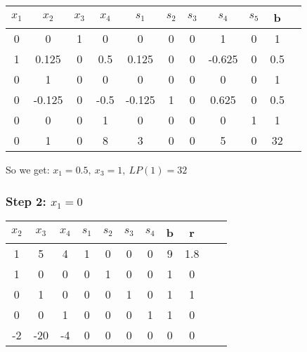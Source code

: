\documentclass{article}
\begin{document}
\begin{center}
\begin{tabular}{|c|c|c|c|c|c|c|c|c|c|c|}
\hline
$x_1$  & $x_2$ & $x_3$  & $x_4$ & $s_1$ & $s_2$ & $s_3$ & $s_4$ & $s_5$ & b     \\ \hline
0  & 0      & 1  & 0    & 0      & 0  & 0  & 1      & 0  & 1   \\ \hline
1  & 0.125  & 0  & 0.5  & 0.125  & 0  & 0  & -0.625 & 0  & 0.5   \\ \hline
0  & 1      & 0  & 0    & 0      & 0  & 0  & 0      & 0  & 1   \\ \hline
0  & -0.125 & 0  & -0.5 & -0.125 & 1  & 0  & 0.625  & 0  & 0.5 \\ \hline
0  & 0      & 0  & 1    & 0      & 0  & 0  & 0      & 1  & 1   \\ \hline
0  & 1      & 0  & 8    & 3      & 0  & 0  & 5      & 0  & 32  \\ \hline
\end{tabular}
\end{center}

So we get: $x_1=0.5,\: x_3=1, \: LP(1)=32$
\\
\subsubsection*{Step 2: $x_1=0$}
\begin{center}
\begin{tabular}{|c|c|c|c|c|c|c|c|c|c|c|}
\hline
$x_2$ & $x_3$  & $x_4$ & $s_1$ & $s_2$ & $s_3$ & $s_4$ & b  & r \\ \hline
1  & \cellcolor{pink!25}5   & 4  & 1  & 0  & 0  & 0  & 9 & 1.8 \\ \hline
1  & \cellcolor{pink!25}0   & 0  & 0  & 1  & 0  & 0  & 1 & 0   \\ \hline
0\cellcolor{yellow!25}  & \cellcolor{pink!25}1   & \cellcolor{yellow!25}0  & \cellcolor{yellow!25}0  & \cellcolor{yellow!25}0  & \cellcolor{yellow!25}1  & \cellcolor{yellow!25}0  & \cellcolor{yellow!25}1 & \cellcolor{yellow!25}1   \\ \hline
0  & \cellcolor{pink!25}0   & 1  & 0  & 0  & 0  & 1  & 1 & 0   \\ \hline
-2 & \cellcolor{pink!25}-20 & -4 & 0  & 0  & 0  & 0  & 0 & 0   \\ \hline
\end{tabular}
\end{center}
\end{document}
